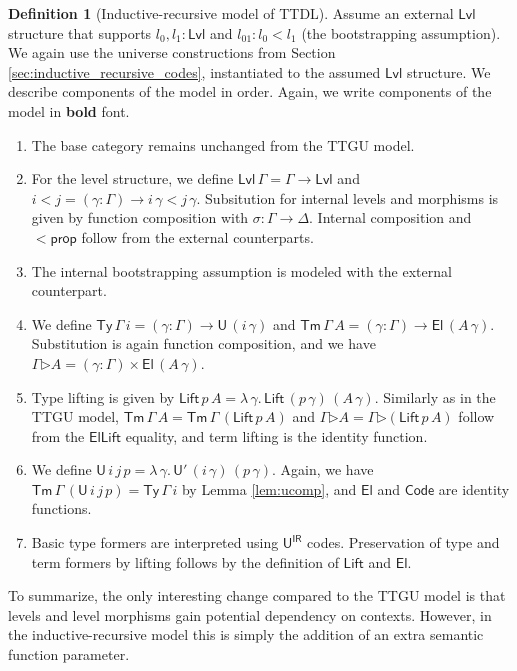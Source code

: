 \documentclass[a4paper,UKenglish,cleveref, autoref, thm-restate]{lipics-v2021}
\theoremstyle{remark}
\theoremstyle{definition}
\newtheorem{mydefinition}{Definition}
\newcommand{\Ty}{\mathsf{Ty}}
\newcommand{\Tm}{\mathsf{Tm}}
\newcommand{\U}{\mathsf{U}}
\newcommand{\El}{\mathsf{El}}
\newcommand{\ext}{\triangleright}
\newcommand{\Lift}{\mathsf{Lift}}
\newcommand{\Lvl}{\mathsf{Lvl}}
\renewcommand{\U}{\mathsf{U}}
\newcommand{\Code}{\mathsf{Code}}
\newcommand{\msf}[1]{\mathsf{#1}}
\newcommand{\uir}{\msf{U^{IR}}}
\begin{document}
\begin{mydefinition}[Inductive-recursive model of TTDL]\label{def:ttdlmodel}
 Assume an external $\Lvl$ structure that supports $l_0, l_1 : \Lvl$ and $l_{01}
 : l_0 < l_1$ (the bootstrapping assumption). We again use the universe
 constructions from Section \ref{sec:inductive_recursive_codes}, instantiated to
 the assumed $\Lvl$ structure. We describe components of the model in
 order. Again, we write components of the model in \textbf{bold} font.
\begin{enumerate}
\item The base category remains unchanged from the TTGU model.
\item For the level structure, we define $\bm{\Lvl}\,\Gamma = \Gamma \to \Lvl$ and
  $i \bm{<} j = (\gamma : \Gamma) \to i\,\gamma < j\,\gamma$. Subsitution for internal
  levels and morphisms is given by function composition with $\sigma : \Gamma \to \Delta$.
  Internal composition and $\bm{<\!\msf{prop}}$ follow from the external counterparts.
\item The internal bootstrapping assumption is modeled with the external counterpart.
\item We define $\bm{\Ty}\,\Gamma\,i = (\gamma : \Gamma) \to \U\,(i\,\gamma)$ and
  $\bm{\Tm}\,\Gamma\,A = (\gamma : \Gamma) \to \El\,(A\,\gamma)$. Substitution is
  again function composition, and we have $\Gamma \bm{\ext} A = (\gamma :
  \Gamma)\times \El\,(A\,\gamma)$.
\item Type lifting is given by $\bm{\Lift}\,p\,A = \lambda\,\gamma.\,
  \Lift\,(p\,\gamma)\,(A\,\gamma)$.  Similarly as in the TTGU model,
  $\bm{\Tm}\,\Gamma\,A = \bm{\Tm}\,\Gamma\,(\bm{\Lift}\,p\,A)$ and $\Gamma \bm{\ext}
  A = \Gamma \bm{\ext} (\bm{\Lift}\,p\,A)$ follow from the $\msf{ElLift}$
  equality, and term lifting is the identity function.
\item We define $\bm{\U}\,i\,j\,p = \lambda\,\gamma.\,\U'\,(i\,\gamma)\,(p\,\gamma)$. Again,
  we have $\bm{\Tm}\,\Gamma\,(\U\,i\,j\,p) = \bm{\Ty}\,\Gamma\,i$ by Lemma \ref{lem:ucomp},
  and $\bm{\El}$ and $\bm{\Code}$ are identity functions.
\item Basic type formers are interpreted using $\uir$ codes. Preservation of
  type and term formers by lifting follows by the definition of $\Lift$ and
  $\El$.
\end{enumerate}
\end{mydefinition}

To summarize, the only interesting change compared to the TTGU model is that
levels and level morphisms gain potential dependency on contexts. However, in
the inductive-recursive model this is simply the addition of an extra semantic
function parameter.
\end{document}
